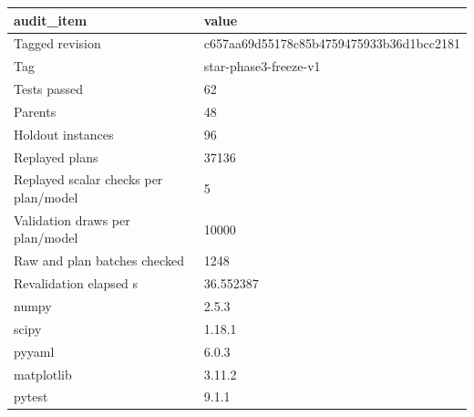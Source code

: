 \begin{tabular}{ll}
\hline
audit\_item & value \\
\hline
Tagged revision & c657aa69d55178c85b4759475933b36d1bcc2181 \\
Tag & star-phase3-freeze-v1 \\
Tests passed & 62 \\
Parents & 48 \\
Holdout instances & 96 \\
Replayed plans & 37136 \\
Replayed scalar checks per plan/model & 5 \\
Validation draws per plan/model & 10000 \\
Raw and plan batches checked & 1248 \\
Revalidation elapsed s & 36.552387 \\
numpy & 2.5.3 \\
scipy & 1.18.1 \\
pyyaml & 6.0.3 \\
matplotlib & 3.11.2 \\
pytest & 9.1.1 \\
\hline
\end{tabular}
